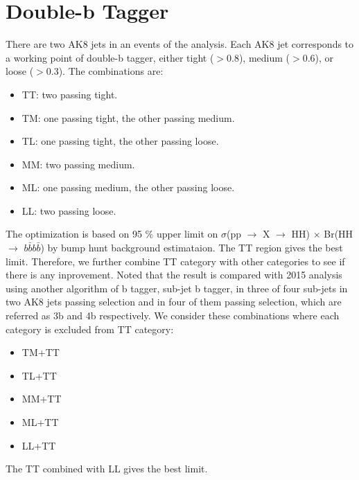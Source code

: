 \clearpage
\section{Double-b Tagger}
There are two AK8 jets in an events of the analysis. Each AK8 jet corresponds to a working point of double-b tagger, either tight ($>$0.8), medium ($>$0.6), or loose ($>$0.3). The combinations are: 
\begin{itemize}
\item TT: two passing tight.
\item TM: one passing tight, the other passing medium.
\item TL: one passing tight, the other passing loose.
\item MM: two passing medium.
\item ML: one passing medium, the other passing loose.
\item LL: two passing loose.
\end{itemize}
The optimization is based on 95 $\% $ upper limit on $\sigma$(pp $\rightarrow$ X $\rightarrow$ HH) $\times$ Br(HH $\rightarrow$ $b\bar{b}b\bar{b}$) by bump hunt background estimataion. The TT region gives the best limit. Therefore, we further combine TT category with other categories to see if there is any inprovement. Noted that the result is compared with 2015 analysis using another algorithm of b tagger, sub-jet b tagger, in three of four sub-jets in two AK8 jets passing selection and in four of them passing selection, which are referred as 3b and 4b respectively. We consider these combinations where each category is excluded from TT category:

\begin{itemize}
\item TM+TT
\item TL+TT
\item MM+TT
\item ML+TT
\item LL+TT
\end{itemize}
The TT combined with LL gives the best limit.

